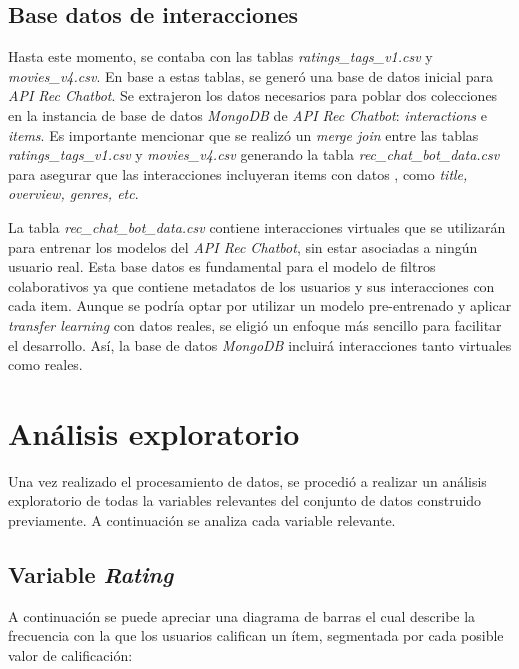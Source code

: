 \documentclass[11pt,a4paper,twoside]{thesis}
\begin{document}
\subsection{Base datos de interacciones}

Hasta este momento, se contaba con las tablas \textit{ratings\_tags\_v1.csv} y \textit{movies\_v4.csv}. En base a estas tablas, se generó una base de datos inicial para \textit{API Rec Chatbot}. Se extrajeron los datos necesarios para poblar dos colecciones en la instancia de base de datos \textit{MongoDB} de \textit{API Rec Chatbot}: \textit{interactions} e \textit{items}. Es importante mencionar que se realizó un \textit{merge join} entre las tablas \textit{ratings\_tags\_v1.csv} y \textit{movies\_v4.csv} generando la tabla \textit{rec\_chat\_bot\_data.csv} para asegurar que las interacciones incluyeran items con datos , como \textit{title, overview, genres, etc}.

La tabla \textit{rec\_chat\_bot\_data.csv} contiene interacciones virtuales que se utilizarán para entrenar
los modelos del \textit{API Rec Chatbot}, sin estar asociadas a ningún usuario real. Esta base datos es fundamental
para el modelo de filtros colaborativos ya que contiene metadatos de los usuarios y sus interacciones con cada item.
Aunque se podría optar por utilizar un modelo pre-entrenado y aplicar \textit{transfer learning} con datos reales,
se eligió un enfoque más sencillo para facilitar el desarrollo. Así, la base de datos \textit{MongoDB} incluirá interacciones
tanto virtuales como reales.

\clearpage

\section{Análisis exploratorio}


Una vez realizado el procesamiento de datos, se procedió a realizar un análisis exploratorio de todas la variables relevantes del conjunto de datos construido previamente.
A continuación se analiza cada variable relevante.

\subsection{Variable \textit{Rating}}

A continuación se puede apreciar una diagrama de barras el cual describe la
frecuencia con la que los usuarios califican un ítem, segmentada por cada
posible valor de calificación:
\end{document}
